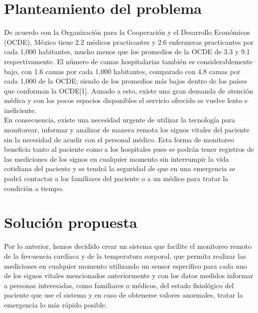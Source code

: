 
\section{Planteamiento del problema}
De acuerdo con la Organización para la Cooperación y el Desarrollo Económicos (OCDE), México tiene 2.2 médicos practicantes y 2.6 enfermeras practicantes por cada 1,000 habitantes, mucho menos que los promedios de la OCDE de 3.3 y 9.1 respectivamente. El número de camas hospitalarias también es considerablemente bajo, con 1.6 camas por cada 1,000 habitantes, comparado con 4.8 camas por cada 1,000 de la OCDE; siendo de los promedios más bajos dentro de los países que conforman la OCDE[1]. Aunado a esto, existe una gran demanda de atención médica y con los pocos espacios disponibles el servicio ofrecido se vuelve lento e ineficiente.\\

En consecuencia, existe una necesidad urgente de utilizar la tecnología para monitorear, informar y analizar de manera remota los signos vitales del paciente sin la necesidad de acudir con el personal médico. Esta forma de monitoreo beneficia tanto al paciente como a los hospitales pues se podrán tener registros de las mediciones de los signos en cualquier momento sin interrumpir la vida cotidiana del paciente y se tendrá la seguridad de que en una emergencia se podrá contactar a los familiares del paciente o a un médico para tratar la condición a tiempo.\\

\section{Solución propuesta}
Por lo anterior, hemos decidido crear un sistema que facilite el monitoreo remoto de la frecuencia cardíaca y de la temperatura corporal, que permita realizar las mediciones en cualquier momento utilizando un sensor específico para cada uno de los signos vitales mencionados anteriormente y con los datos medidos informar a personas interesadas, como familiares o médicos, del estado fisiológico del paciente que use el sistema y en caso de obtenerse valores anormales, tratar la emergencia lo más rápido posible.

